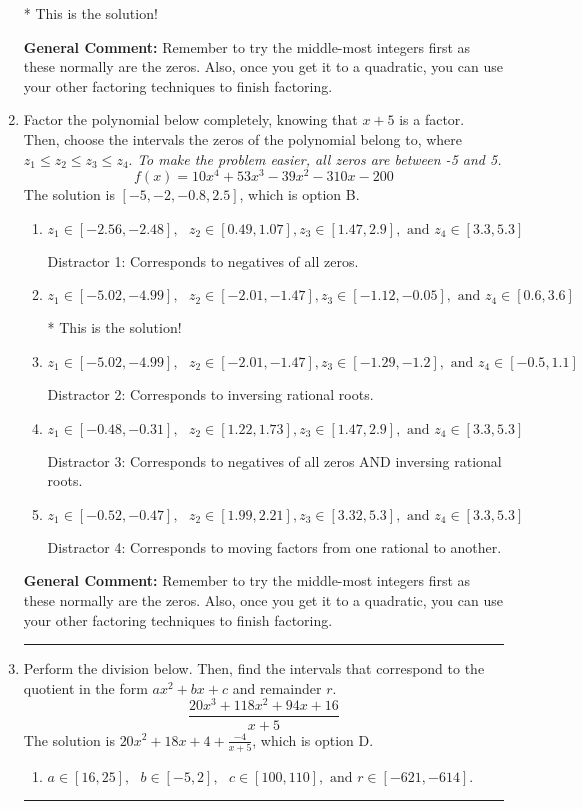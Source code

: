 \documentclass{extbook}[14pt]
\newcommand{\litem}[1]{\item #1

\rule{\textwidth}{0.4pt}}
\begin{document}
\begin{enumerate}
{\begin{enumerate}[label=\Alph*.]
* This is the solution!
\end{enumerate}

\textbf{General Comment:} Remember to try the middle-most integers first as these normally are the zeros. Also, once you get it to a quadratic, you can use your other factoring techniques to finish factoring.
}
\litem{
Factor the polynomial below completely, knowing that $x + 5$ is a factor. Then, choose the intervals the zeros of the polynomial belong to, where $z_1 \leq z_2 \leq z_3 \leq z_4$. \textit{To make the problem easier, all zeros are between -5 and 5.}
\[ f(x) = 10x^{4} +53 x^{3} -39 x^{2} -310 x -200 \]The solution is \( [-5, -2, -0.8, 2.5] \), which is option B.\begin{enumerate}[label=\Alph*.]
\item \( z_1 \in [-2.56, -2.48], \text{   }  z_2 \in [0.49, 1.07], z_3 \in [1.47, 2.9], \text{   and   } z_4 \in [3.3, 5.3] \)

 Distractor 1: Corresponds to negatives of all zeros.
\item \( z_1 \in [-5.02, -4.99], \text{   }  z_2 \in [-2.01, -1.47], z_3 \in [-1.12, -0.05], \text{   and   } z_4 \in [0.6, 3.6] \)

* This is the solution!
\item \( z_1 \in [-5.02, -4.99], \text{   }  z_2 \in [-2.01, -1.47], z_3 \in [-1.29, -1.2], \text{   and   } z_4 \in [-0.5, 1.1] \)

 Distractor 2: Corresponds to inversing rational roots.
\item \( z_1 \in [-0.48, -0.31], \text{   }  z_2 \in [1.22, 1.73], z_3 \in [1.47, 2.9], \text{   and   } z_4 \in [3.3, 5.3] \)

 Distractor 3: Corresponds to negatives of all zeros AND inversing rational roots.
\item \( z_1 \in [-0.52, -0.47], \text{   }  z_2 \in [1.99, 2.21], z_3 \in [3.32, 5.3], \text{   and   } z_4 \in [3.3, 5.3] \)

 Distractor 4: Corresponds to moving factors from one rational to another.
\end{enumerate}

\textbf{General Comment:} Remember to try the middle-most integers first as these normally are the zeros. Also, once you get it to a quadratic, you can use your other factoring techniques to finish factoring.
}
\litem{
Perform the division below. Then, find the intervals that correspond to the quotient in the form $ax^2+bx+c$ and remainder $r$.
\[ \frac{20x^{3} +118 x^{2} +94 x + 16}{x + 5} \]The solution is \( 20x^{2} +18 x + 4 + \frac{-4}{x + 5} \), which is option D.\begin{enumerate}[label=\Alph*.]
\item \( a \in [16, 25], \text{   } b \in [-5, 2], \text{   } c \in [100, 110], \text{   and   } r \in [-621, -614]. \)


\end{enumerate}}
\end{enumerate}
\end{document}
